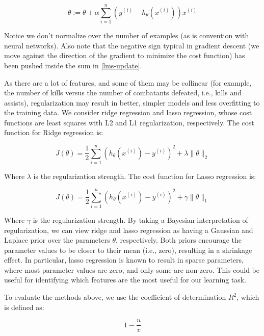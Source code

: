 \documentclass[conference]{IEEEtran}
\begin{document}
\begin{equation}
    \theta := \theta + \alpha \sum_{i=1}^n
    (y^{(i)} -
    h_\theta (x^{(i)}))x^{(i)}\label{lms-update}
\end{equation}

Notice we don't normalize over the number of examples (as is convention with
neural networks). Also note that the negative sign typical in gradient descent
(we move against the direction of the gradient to minimize the cost function)
has been pushed inside the sum in \eqref{lms-update}.

As there are a lot of features, and some of them may be collinear (for example,
the number of kills versus the number of combatants defeated, i.e., kills and
assists), regularization may result in better, simpler models and less
overfitting to the training data. We consider ridge regression and lasso
regression, whose cost functions are least squares with L2 and L1
regularization, respectively. The cost function for Ridge regression is:

\begin{equation}
    J(\theta) = \frac{1}{2} \sum_{i = 1}^n
    (h_\theta (x^{(i)}) - y^{(i)})^2 + \lambda
    \|\theta\|_2
\end{equation}

Where $\lambda$ is the regularization strength. The cost function
for Lasso regression is:

\begin{equation}
    J(\theta) = \frac{1}{2} \sum_{i = 1}^n
    (h_\theta (x^{(i)}) - y^{(i)})^2 + \gamma
    \|\theta\|_1
\end{equation}

Where $\gamma$ is the regularization strength. By taking a
Bayesian interpretation of regularization, we can view ridge and lasso
regression as having a Gaussian and Laplace prior over the parameters
$\theta$, respectively. Both priors encourage the parameter
values to be closer to their mean (i.e., zero), resulting in a shrinkage
effect. In particular, lasso regression is known to result in sparse
parameters, where most parameter values are zero, and only some are non-zero.
This could be useful for identifying which features are the most useful for our
learning task.

To evaluate the methods above, we use the coefficient of determination
$R^2$, which is defined as:

\begin{equation}
    1 - \frac{u}{v}
\end{equation}
\end{document}
